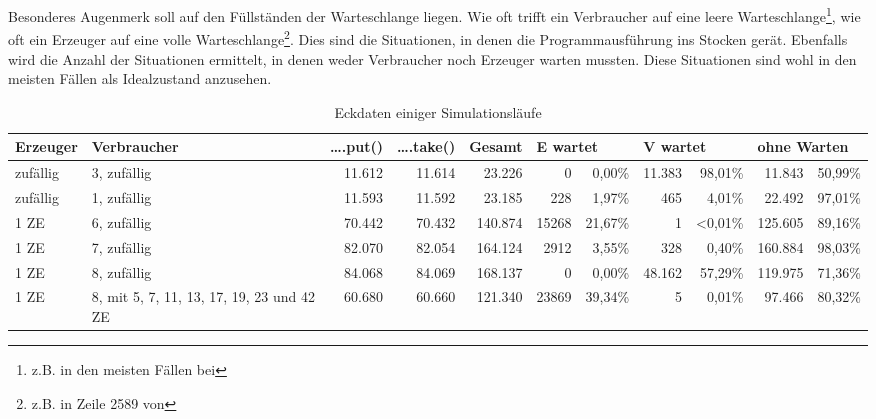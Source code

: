Besonderes Augenmerk soll auf den Füllständen der Warteschlange liegen. Wie oft trifft ein Verbraucher auf eine leere Warteschlange\footnote{z.B. in den meisten Fällen bei }, wie oft ein Erzeuger auf eine volle Warteschlange\footnote{z.B. in Zeile 2589 von }. Dies sind die Situationen, in denen die Programmausführung ins Stocken gerät. Ebenfalls wird die Anzahl der Situationen ermittelt, in denen weder Verbraucher noch Erzeuger warten mussten. Diese Situationen sind wohl in den meisten Fällen als Idealzustand anzusehen.

\begin{landscape}
\begin{footnotesize}
\begin{table}[H]
\begin{center}
\begin{tabular}{| p{3cm} | p{3cm} || r | r | r | r r | r r | r r |}  \hline                       
  \textbf{Erzeuger}	& \textbf{Verbraucher}  & \textbf{….put()} & \textbf{….take()} & \textbf{Gesamt} & \multicolumn{2}{|l|}{\textbf{E wartet}} & \multicolumn{2}{|l|}{\textbf{V wartet}} & \multicolumn{2}{|l|}{\textbf{ohne Warten}}  \\ \hline 
zufällig 		& 3, zufällig & 11.612 			 & 11.614 			 & 23.226 		   & 0 		 & 0,00\% 						 & 11.383  & 98,01\% 					   & 11.843		&	50,99\%	\\ \hline
zufällig 		& 1, zufällig & 11.593		     & 11.592 			 & 23.185 		   & 228 	 & 1,97\% 						 & 465     &  4,01\% 					   & 22.492		&	97,01\%	\\ \hline
1 ZE 			& 6, zufällig & 70.442 	 	     & 70.432 			 & 140.874 		   & 15268 	 & 21,67\% 						 & 1       &  <0,01\% 					   & 125.605	&  89,16\%	\\ \hline
1 ZE 			& 7, zufällig & 82.070 	 		 & 82.054 			 & 164.124 		   & 2912    & 3,55\% 						 & 328     & 0,40\% 					   & 160.884		&	98,03\%	\\ \hline
1 ZE 			& 8, zufällig & 84.068 	 		 & 84.069 			 & 168.137 		   & 0 	 & 0,00\% 						 & 48.162  & 57,29\% 					   & 119.975	&	71,36\%	\\ \hline
1 ZE & 8, mit 5, 7, 11, 13, 17, 19, 23 und 42 ZE & 60.680 & 60.660	 & 121.340 		   & 23869 		 & 39,34\% 						 & 5  & 0,01\% 					   & 97.466		&	80,32\%	\\ \hline
\end{tabular}
\caption{Eckdaten einiger Simulationsläufe}
\label{tab:ergebnisse}
\end{center}
\end{table}

\end{footnotesize}
\end{landscape}
